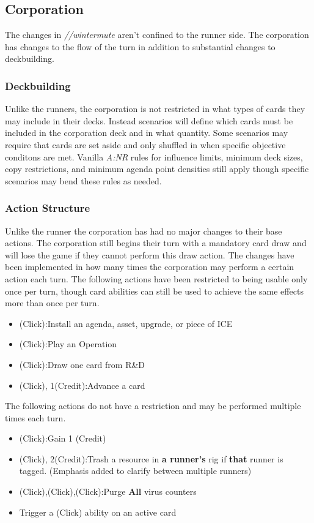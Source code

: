 \documentclass[titlepage]{article}
\begin{document}
\subsection{Corporation}

The changes in \emph{//wintermute} aren't confined to the runner side. The corporation has changes to the flow of the turn in addition to substantial changes to deckbuilding.

\subsubsection{Deckbuilding}

Unlike the runners, the corporation is not restricted in what types of cards they may include in their decks. Instead scenarios will define which cards must be included in the corporation deck and in what quantity. Some scenarios may require that cards are set aside and only shuffled in when specific objective conditons are met. Vanilla \emph{A:NR} rules for influence limits, minimum deck sizes, copy restrictions, and minimum agenda point densities still apply though specific scenarios may bend these rules as needed.

\subsubsection{Action Structure}

Unlike the runner the corporation has had no major changes to their base actions. The corporation still begins their turn with a mandatory card draw and will lose the game if they cannot perform this draw action. The changes have been implemented in how many times the corporation may perform a certain action each turn. The following actions have been restricted to being usable only once per turn, though card abilities can still be used to achieve the same effects more than once per turn.
\begin{itemize}
	\item (Click):Install an agenda, asset, upgrade, or piece of ICE
	\item (Click):Play an Operation
	\item (Click):Draw one card from R\&D
	\item (Click), 1(Credit):Advance a card
\end{itemize}

The following actions do not have a restriction and may be performed multiple times each turn.

\begin{itemize}
	\item (Click):Gain 1 (Credit)
	\item (Click), 2(Credit):Trash a resource in \textbf{a runner's} rig if \textbf{that} runner is tagged. (Emphasis added to clarify between multiple runners)
	\item (Click),(Click),(Click):Purge \textbf{All} virus counters
	\item Trigger a (Click) ability on an active card
\end{itemize}
\end{document}
